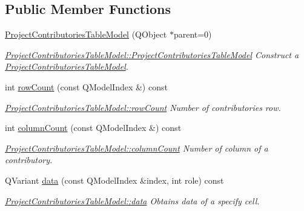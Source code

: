 \subsection*{Public Member Functions}
\begin{DoxyCompactItemize}
\item 
\hyperlink{classGui_1_1Widgets_1_1WdgModels_1_1ProjectContributoriesTableModel_abb9a482809fb18cf5bbc94d3de608e80}{Project\+Contributories\+Table\+Model} (Q\+Object $\ast$parent=0)
\begin{DoxyCompactList}\small\item\em \hyperlink{classGui_1_1Widgets_1_1WdgModels_1_1ProjectContributoriesTableModel_abb9a482809fb18cf5bbc94d3de608e80}{Project\+Contributories\+Table\+Model\+::\+Project\+Contributories\+Table\+Model} Construct a \hyperlink{classGui_1_1Widgets_1_1WdgModels_1_1ProjectContributoriesTableModel}{Project\+Contributories\+Table\+Model}. \end{DoxyCompactList}\item 
int \hyperlink{classGui_1_1Widgets_1_1WdgModels_1_1ProjectContributoriesTableModel_a89017ec04ab8bb1669f05a1dc45a6496}{row\+Count} (const Q\+Model\+Index \&) const 
\begin{DoxyCompactList}\small\item\em \hyperlink{classGui_1_1Widgets_1_1WdgModels_1_1ProjectContributoriesTableModel_a89017ec04ab8bb1669f05a1dc45a6496}{Project\+Contributories\+Table\+Model\+::row\+Count} Number of contributories row. \end{DoxyCompactList}\item 
int \hyperlink{classGui_1_1Widgets_1_1WdgModels_1_1ProjectContributoriesTableModel_a9c4e040dd182d0f3d7a0a3835ca0de2e}{column\+Count} (const Q\+Model\+Index \&) const 
\begin{DoxyCompactList}\small\item\em \hyperlink{classGui_1_1Widgets_1_1WdgModels_1_1ProjectContributoriesTableModel_a9c4e040dd182d0f3d7a0a3835ca0de2e}{Project\+Contributories\+Table\+Model\+::column\+Count} Number of column of a contributory. \end{DoxyCompactList}\item 
Q\+Variant \hyperlink{classGui_1_1Widgets_1_1WdgModels_1_1ProjectContributoriesTableModel_a4848c1f82ecaa85f49f410539a8d5a56}{data} (const Q\+Model\+Index \&index, int role) const 
\begin{DoxyCompactList}\small\item\em \hyperlink{classGui_1_1Widgets_1_1WdgModels_1_1ProjectContributoriesTableModel_a4848c1f82ecaa85f49f410539a8d5a56}{Project\+Contributories\+Table\+Model\+::data} Obtains data of a specify cell. \end{DoxyCompactList}\item 

\end{DoxyCompactItemize}
